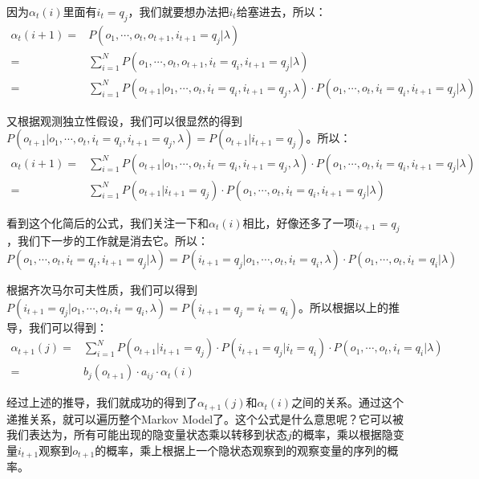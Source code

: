 \documentclass[a4paper]{article}
\begin{document}
因为$\alpha_t(i)$里面有$i_{t}=q_j$，我们就要想办法把$i_{t}$给塞进去，所以：
\begin{equation}
    \begin{split}
        \alpha_t(i+1) 
        = & P(o_1,\cdots,o_t,o_{t+1},i_{t+1}=q_j|\lambda) \\
        = & \sum_{i=1}^N P(o_1,\cdots,o_t,o_{t+1},i_{t}=q_i,i_{t+1}=q_j|\lambda) \\
        = & \sum_{i=1}^N P(o_{t+1}|o_1,\cdots,o_t,i_{t}=q_i,i_{t+1}=q_j,\lambda)
        \cdot P(o_1,\cdots,o_t,i_{t}=q_i,i_{t+1}=q_j|\lambda)
    \end{split}
\end{equation}

又根据观测独立性假设，我们可以很显然的得到$P(o_{t+1}|o_1,\cdots,o_t,i_{t}=q_i,i_{t+1}=q_j,\lambda) = P(o_{t+1}|i_{t+1}=q_j)$。所以：
\begin{equation}
\begin{split}
    \alpha_t(i+1) = & \sum_{i=1}^N P(o_{t+1}|o_1,\cdots,o_t,i_{t} = q_i,i_{t+1}=q_j,\lambda) \cdot P(o_1,\cdots,o_t,i_{t} = q_i,i_{t+1}=q_j|\lambda) \\
    = & \sum_{i=1}^N P(o_{t+1}|i_{t+1}=q_j)\cdot P(o_1,\cdots,o_t,i_{t}=q_i,i_{t+1}=q_j|\lambda)
\end{split}
\end{equation}

看到这个化简后的公式，我们关注一下和$\alpha_t(i)$相比，好像还多了一项$i_{t+1}=q_j$，我们下一步的工作就是消去它。所以：
\begin{equation}
    P(o_1,\cdots,o_t,i_{t}=q_i,i_{t+1}=q_j|\lambda) = P(i_{t+1}=q_j |o_1,\cdots,o_t,i_{t}=q_i,\lambda)\cdot P(o_1,\cdots,o_t,i_{t}=q_i|\lambda) 
\end{equation}

根据齐次马尔可夫性质，我们可以得到$P(i_{t+1}=q_j |o_1,\cdots,o_t,i_{t}=q_i,\lambda) = P(i_{t+1}=q_j = i_{t}=q_i)$。所以根据以上的推导，我们可以得到：
\begin{equation}
    \begin{split}
        \alpha_{t+1}(j) 
        = & \sum_{i=1}^N P(o_{t+1}|i_{t+1}=q_j)\cdot P(i_{t+1}=q_j | i_{t}=q_i) \cdot P(o_1,\cdots,o_t,i_{t}=q_i|\lambda) \\
        = & b_j(o_{t+1})\cdot a_{ij} \cdot \alpha_t(i)
    \end{split}
\end{equation}

经过上述的推导，我们就成功的得到了$\alpha_{t+1}(j)$和$\alpha_t(i)$之间的关系。通过这个递推关系，就可以遍历整个Markov Model了。这个公式是什么意思呢？它可以被我们表达为，所有可能出现的隐变量状态乘以转移到状态$j$的概率，乘以根据隐变量$i_{t+1}$观察到$o_{t+1}$的概率，乘上根据上一个隐状态观察到的观察变量的序列的概率。
\end{document}

